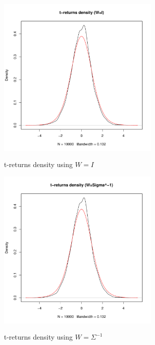 \begin{figure}
    \centering
    \includegraphics[width=0.7\textwidth]{t-returns_density_(W=I).pdf}
    \label{t-returns_density_I}
    \caption{t-returns density using $W=I$}
    \includegraphics[width=0.7\textwidth]{t-returns_density_(W=Sigma^-1).pdf}
    \label{t-returns_density_W}
    \caption{t-returns density using $W=\Sigma^{-1}$}
\end{figure}
